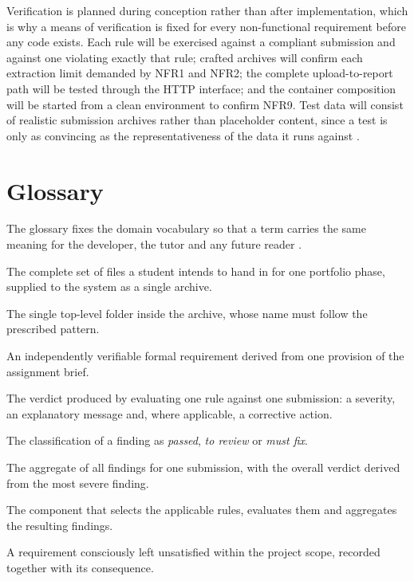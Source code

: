 \documentclass[a4paper,11pt]{article}
\begin{document}
Verification is planned during conception rather than after implementation, which
is why a means of verification is fixed for every non-functional requirement
before any code exists. Each rule will be exercised
against a compliant submission and against one violating exactly that rule;
crafted archives will confirm each extraction limit demanded by NFR1 and NFR2;
the complete upload-to-report path will be tested through the HTTP interface;
and the container composition will be started from a clean environment to
confirm NFR9. Test data will consist of realistic submission archives rather
than placeholder content, since a test is only as convincing as the
representativeness of the data it runs against \citep{Khorikov2020}.

\section{Glossary}\label{sec:glossary}

The glossary fixes the domain vocabulary so that a term carries the same meaning
for the developer, the tutor and any future reader \citep{Sommerville2020}.

\begin{description}[leftmargin=3.4cm, style=nextline, font=\normalfont\bfseries, itemsep=1pt]
\item[Submission] The complete set of files a student intends to hand in for one
portfolio phase, supplied to the system as a single archive.
\item[Main directory] The single top-level folder inside the archive, whose name
must follow the prescribed pattern.
\item[Rule] An independently verifiable formal requirement derived from one
provision of the assignment brief.
\item[Finding] The verdict produced by evaluating one rule against one
submission: a severity, an explanatory message and, where applicable, a
corrective action.
\item[Severity] The classification of a finding as \textit{passed}, \textit{to
review} or \textit{must fix}.
\item[Report] The aggregate of all findings for one submission, with the overall
verdict derived from the most severe finding.
\item[Rule engine] The component that selects the applicable rules, evaluates
them and aggregates the resulting findings.
\item[Technical debt] A requirement consciously left unsatisfied within the
project scope, recorded together with its consequence.
\end{description}
\end{document}
